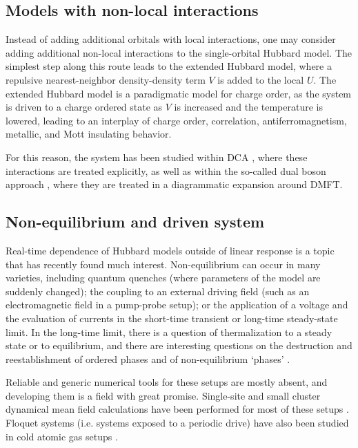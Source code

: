 \documentclass{ar-1col}
\begin{document}
\subsection{Models with non-local interactions}
Instead of adding additional orbitals with local interactions, one may consider adding additional non-local interactions to the single-orbital Hubbard model. The simplest step along this route leads to the extended Hubbard model, where a repulsive nearest-neighbor density-density term $V$ is added to the local $U$. The extended Hubbard model is a paradigmatic model for charge order, as the system is driven to a charge ordered state as $V$ is increased and the temperature is lowered, leading to an interplay of charge order, correlation, antiferromagnetism, metallic, and Mott insulating behavior.

For this reason, the system has been studied within DCA \cite{Terletska17,Terletska18,Jiang18B,Paki19}, where these interactions are treated explicitly, as well as within the so-called dual boson approach \cite{Rohringer18,Stepanov18}, where they are treated in a diagrammatic expansion around DMFT.

\subsection{Non-equilibrium and driven system}
Real-time dependence of Hubbard models outside of linear response is a topic that has recently found much interest. Non-equilibrium can occur in many varieties, including quantum quenches (where parameters of the model are suddenly changed); the coupling to an external driving field (such as an electromagnetic field in a pump-probe setup); or the application of a voltage and the evaluation of currents in the short-time transient or long-time steady-state limit. In the long-time limit, there is a question of thermalization to a steady state or to equilibrium, and there are interesting questions on the destruction and reestablishment of ordered phases and of  non-equilibrium `phases'  \cite{Oka19}.

Reliable and generic numerical tools for these setups are mostly absent, and developing them is a field with great promise. Single-site and small cluster dynamical mean field calculations have been performed for most of these setups \cite{Aoki14}. Floquet systems (i.e. systems exposed to a periodic drive) have also been studied in cold atomic gas setups \cite{Messer18,Sandholzer19}. 
\end{document}

